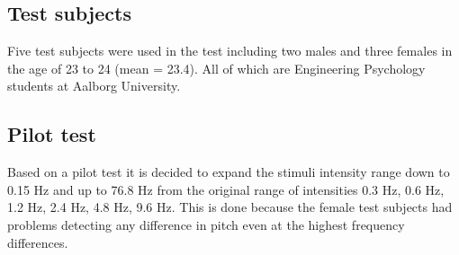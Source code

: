 \subsection*{Test subjects}
%
Five test subjects were used in the test including two males and three females in the age of 23 to 24 (mean = 23.4). All of which are Engineering Psychology students at Aalborg University.

\subsection*{Pilot test}
%
Based on a pilot test it is decided to expand the stimuli intensity range down to 0.15 Hz and up to 76.8 Hz from the original range of intensities 0.3 Hz, 0.6 Hz, 1.2 Hz, 2.4 Hz, 4.8 Hz, 9.6 Hz. This is done because the female test subjects had problems detecting any difference in pitch even at the highest frequency differences.

